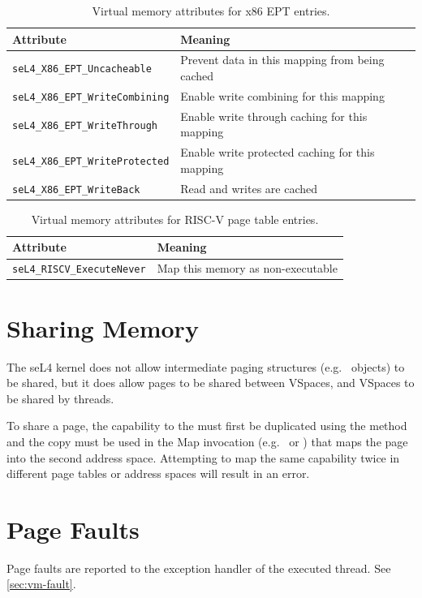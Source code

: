 \begin{table}[htb]
  \begin{center}
    \begin{tabularx}{\textwidth}{p{}X}
      \toprule
      Attribute & Meaning \\
      \midrule
      \texttt{seL4\_X86\_EPT\_Uncacheable} & Prevent data in this mapping
      from being cached \\
      \texttt{seL4\_X86\_EPT\_WriteCombining} & Enable write combining for this mapping \\
      \texttt{seL4\_X86\_EPT\_WriteThrough} & Enable write through caching for this mapping \\
      \texttt{seL4\_X86\_EPT\_WriteProtected} & Enable write protected caching for this mapping \\
      \texttt{seL4\_X86\_EPT\_WriteBack} & Read and writes are cached \\
      \bottomrule
    \end{tabularx}
    \caption{\label{tbl:vmattr_x86_ept} Virtual memory attributes for x86 EPT entries.}
  \end{center}
\end{table}

\begin{table}[htb]
  \begin{center}
    \begin{tabularx}{\textwidth}{p{}X}
      \toprule
      Attribute & Meaning \\
      \midrule
      \texttt{seL4\_RISCV\_ExecuteNever} & Map this memory as non-executable \\
      \bottomrule
    \end{tabularx}
    \caption{\label{tbl:vmattr_riscv} Virtual memory attributes for RISC-V page
      table entries.}
  \end{center}
\end{table}

\FloatBarrier

\section{Sharing Memory}

The seL4 kernel does not allow intermediate paging structures (e.g.\  objects) to be
shared, but it does allow pages to be shared between VSpaces, and VSpaces to be shared by threads.

To share a page, the capability to the  must first be duplicated using the
 method and the copy must be used in the Map invocation
(e.g.\  \ifxeightsix or
\fi) that maps the page into the second address space.
Attempting to map the same capability twice in different page tables or address spaces will result
in an error.


\section{Page Faults}

Page faults are reported to the exception handler of the executed thread.
See \autoref{sec:vm-fault}.
